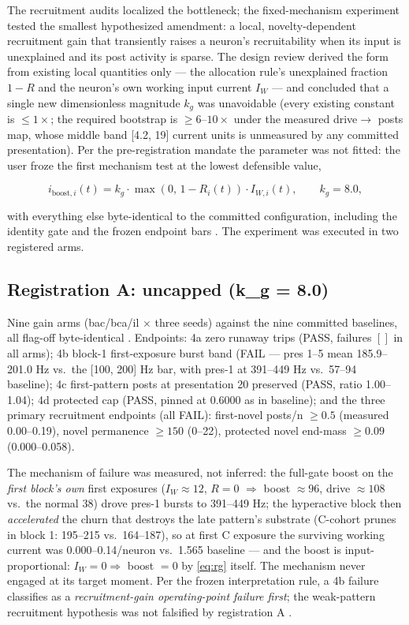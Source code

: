 The recruitment audits localized the bottleneck; the fixed-mechanism
experiment tested the smallest hypothesized amendment: a local,
novelty-dependent recruitment gain that transiently raises a neuron's
recruitability when its input is unexplained and its post activity is
sparse. The design review \cite{designreview} derived the form from
existing local quantities only --- the allocation rule's unexplained
fraction \(1-R\) and the neuron's own working input current \(I_W\) ---
and concluded that a single new dimensionless magnitude \(k_g\) was
unavoidable (every existing constant is \(\le 1\times\); the required
bootstrap is \(\ge 6\)--\(10\times\) under the measured drive\(\to\)
posts map, whose middle band [4.2, 19] current units is unmeasured by
any committed presentation). Per the pre-registration mandate the
parameter was not fitted: the user froze the first mechanism test at
the lowest defensible value,

\begin{equation}
  i_{\mathrm{boost},i}(t) = k_g \cdot \max(0,\, 1 - R_i(t)) \cdot I_{W,i}(t),
  \qquad k_g = 8.0,
  \label{eq:rg}
\end{equation}

with everything else byte-identical to the committed configuration,
including the identity gate and the frozen endpoint bars
\cite{designreview}. The experiment was executed in two registered
arms.

\subsection{Registration A: uncapped (k\_g = 8.0)}

Nine gain arms (bac/bca/il \(\times\) three seeds) against the nine
committed baselines, all flag-off byte-identical \cite{rg8}.
Endpoints: 4a zero runaway trips (PASS, failures \([]\) in all arms);
4b block-1 first-exposure burst band (FAIL --- pres 1--5 mean
185.9--201.0 Hz vs.\ the [100, 200] Hz bar, with pres-1 at 391--449 Hz
vs.\ 57--94 baseline); 4c first-pattern posts at presentation 20
preserved (PASS, ratio 1.00--1.04); 4d protected cap (PASS, pinned at
0.6000 as in baseline); and the three primary recruitment endpoints
(all FAIL): first-novel posts/n \(\ge 0.5\) (measured 0.00--0.19),
novel permanence \(\ge 150\) (0--22), protected novel end-mass
\(\ge 0.09\) (0.000--0.058).

The mechanism of failure was measured, not inferred: the full-gate
boost on the \emph{first block's own} first exposures
(\(I_W \approx 12\), \(R=0\) \(\Rightarrow\) boost \(\approx 96\),
drive \(\approx 108\) vs.\ the normal 38) drove pres-1 bursts to
391--449 Hz; the hyperactive block then \emph{accelerated} the churn
that destroys the late pattern's substrate (C-cohort prunes in block 1:
195--215 vs.\ 164--187), so at first C exposure the surviving working
current was 0.000--0.14/neuron vs.\ 1.565 baseline --- and the boost is
input-proportional: \(I_W = 0 \Rightarrow\) boost \(= 0\) by
\eqref{eq:rg} itself. The mechanism never engaged at its target moment.
Per the frozen interpretation rule, a 4b failure classifies as a
\emph{recruitment-gain operating-point failure first}; the weak-pattern
recruitment hypothesis was not falsified by registration A
\cite{rg8}.

